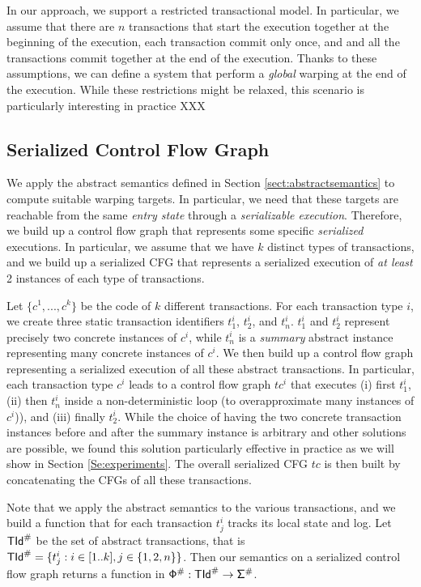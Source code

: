 In our approach, we support a restricted transactional model. In particular, we assume that there are $n$ transactions that start the execution together at the beginning of the execution, each transaction commit only once, and and all the transactions commit together at the end of the execution. Thanks to these assumptions, we can define a system that perform a \emph{global} warping at the end of the execution. While these restrictions might be relaxed, this scenario is particularly interesting in practice XXX


\subsection{Serialized Control Flow Graph}
\label{Se:concabs}
We apply the abstract semantics defined in Section \ref{sect:abstractsemantics} to compute suitable warping targets. In particular, we need that these targets are reachable from the same \emph{entry state} through a \emph{serializable execution}. Therefore, we build up a control flow graph that represents some specific \emph{serialized} executions. In particular, we assume that we have $k$ distinct types of transactions, and we build up a serialized CFG that represents a serialized execution of \emph{at least} 2 instances of each type of transactions.

Let $\{c^1, ..., c^k\}$ be the code of $k$ different transactions. For each transaction type $i$, we create three static transaction identifiers $t^i_1$, $t^i_2$, and $t^i_n$. $t^i_1$ and $t^i_2$ represent precisely two concrete instances of $c^i$, while $t^i_n$ is a \emph{summary} abstract instance representing many concrete instances of $c^i$. We then build up a control flow graph representing a serialized execution of all these abstract transactions. In particular, each transaction type $c^i$ leads to a control flow graph $tc^i$ that executes (i) first $t^i_1$, (ii) then $t^i_n$ inside a non-deterministic loop (to overapproximate many instances of $c^i$)), and (iii) finally $t^i_2$. While the choice of having the two concrete transaction instances before and after the summary instance is arbitrary and other solutions are possible, we found this solution particularly effective in practice as we will show in Section \ref{Se:experiments}. The overall serialized CFG $tc$ is then built by concatenating the CFGs of all these transactions.

Note that we apply the abstract semantics to the various transactions, and we build a function that for each transaction $t^i_j$ tracks its local state and log. Let $\mathsf{\mathsf{TId}}^\#$ be the set of abstract transactions, that is $\mathsf{\mathsf{TId}}^\# = \{t^i_j : i \in [1..k], j \in \{1, 2, n\}\}$. Then our semantics on a serialized control flow graph returns a function in $\mathsf{\mathsf{\Phi}}^\# : \mathsf{\mathsf{TId}}^\# \to \mathsf{\Sigma}^\#$.

